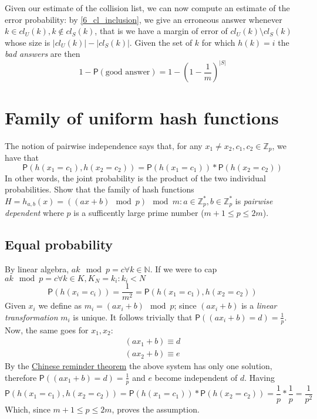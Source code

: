 \documentclass{article}
\newcommand*{\prob}{\mathsf{P}}     %
\begin{document}
Given our estimate of the collision list, we can now compute an estimate of the error probability: by \ref{6_cl_inclusion}, we give an erroneous answer whenever $k \in cl_{U}(k), k \notin cl_{S}(k)$, that is we have a margin of error of $cl_{U}(k) \setminus cl_{S}(k)$ whose size is $|cl_{U}(k)| - |cl_{S}(k)|$.
Given the set of $k$ for which $h(k) = i$ the \emph{bad answers} are then
\begin{equation}
    1 - \prob(\textrm{good answer}) = 1 - (1 - \frac{1}{m})^{|S|}
\end{equation}

\newpage
\section{Family of uniform hash functions}

The notion of pairwise independence says that, for any $x_{1} \neq x_{2}, c_{1}, c_{2}
\in \mathbb{Z}_{p}$, we have that
    \begin{equation}
    \prob(h(x_{1} = c_{1}), h(x_{2} = c_{2})) = \prob(h(x_{1} = c_{1})) * \prob(h(x_{2} = c_{2}))
    \end{equation}
In other words, the joint probability is the product of the two individual probabilities.
Show that the family of hash functions $H = {h_{a,b}(x) = ((ax + b) \mod p) \mod m}:
a \in \mathbb{Z}^{*}_{p},
b \in \mathbb{Z}^{*}_{p}$ is \emph{pairwise dependent}
where $p$ is a sufficently large prime number ($m + 1 \leq p \leq 2m$).

\subsection{Equal probability}

By linear algebra, $ak \mod p = c \forall k \in \mathbb{N}$.
If we were to cap $ak \mod p = c \forall k \in K, K_{N} = {k_{i}: k_{i} < N}$
\begin{equation}
\prob(h(x_{i} = c_{i})) = \frac{1}{m^{2}} = \prob(h(x_{1} = c_{1}), h(x_{2} = c_{2}))
\end{equation}
Given $x_{i}$ we define as $m_{i} = (a x_{i} + b) \mod p$; since $(a x_{i} + b)$
is a \emph{linear transformation} $m_{i}$ is unique.
It follows trivially that $\prob((a x_{i} + b) = d) = \frac{1}{p}$.
Now, the same goes for $x_{1}, x_{2}$:
    \begin{gather}
    (a x_{1} + b) \equiv d                                                           \\
    (a x_{2} + b) \equiv e
    \end{gather}
By the \href{http://en.wikipedia.org/wiki/Chinese_remainder_theorem}{Chinese reminder theorem}
the above system has only one solution, therefore $\prob((a x_{1} + b) = d) = \frac{1}{p}$ and
$e$ become independent of $d$.
Having
\begin{equation}
    \prob(h(x_{1} = c_{1}), h(x_{2} = c_{2})) =
    \prob(h(x_{1} = c_{1})) * \prob(h(x_{2} = c_{2})) =\frac{1}{p} * \frac{1}{p} = \frac{1}{p^{2}}
\end{equation}
Which, since $m + 1 \leq p \leq 2m$, proves the assumption.
\end{document}
